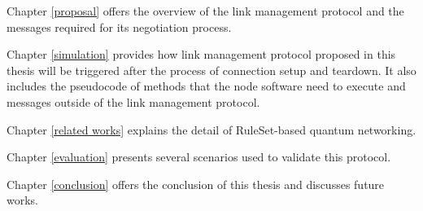 Chapter \ref{proposal} offers the overview of the link management protocol and the messages required for its negotiation process.

Chapter \ref{simulation} provides how link management protocol proposed in this thesis will be triggered after the process of connection setup and teardown. It also includes the pseudocode of methods that the node software need to execute and messages outside of the link management protocol.

Chapter \ref{related works} explains the detail of RuleSet-based quantum networking.

Chapter \ref{evaluation} presents several scenarios used to validate this protocol.

Chapter \ref{conclusion} offers the conclusion of this thesis and discusses future works.



